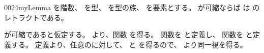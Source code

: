 \documentclass[index]{subfiles}
\begin{document}
\begin{myBlock}{0024}{myLemma}
  を階数、
  を型、
  を型の族、
  を要素とする。
  が可縮ならば
  は
  のレトラクトである。
\end{myBlock}
\begin{myProof}
  が可縮であると仮定する。
  より、関数
  を得る。
  関数を
  と定義し、
  関数を
  と定義する。
  定義より、任意のに対して、
  と
  を得るので、
  より同一視を得る。
\end{myProof}
\end{document}
